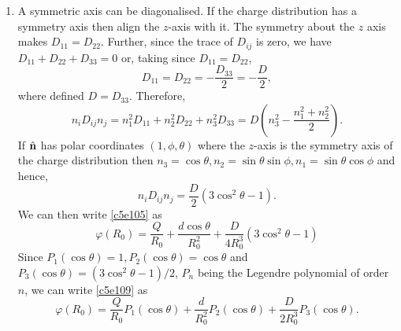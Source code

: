 \begin{enumerate}
\item A symmetric axis can be diagonalised. If the charge distribution has a 
symmetry axis then align the $z$-axis with it. The symmetry about the $z$ axis
makes $D_{11} = D_{22}$. Further, since the trace of $D_{ij}$ is zero, we have 
$D_{11} + D_{22} + D_{33} = 0$ or, taking since $D_{11} = D_{22}$,
\begin{equation}\label{c5e106}
D_{11} = D_{22} = -\frac{D_{33}}{2} = -\frac{D}{2},
\end{equation}
where defined $D = D_{33}$. Therefore,
\[
n_i D_{ij} n_j = n_1^2D_{11} + n_2^2D_{22} + n_3^2D_{33} = 
D\left(n_3^2 - \frac{n_1^2 + n_2^2}{2}\right).
\]
If $\hat{\mathbf{n}}$ has polar coordinates $(1, \phi, \theta)$ where the $z$-axis is the 
symmetry axis of the charge distribution then $n_3 = \cos\theta, n_2 = \sin\theta
\sin\phi, n_1 = \sin\theta\cos\phi$ and hence,
\begin{equation}\label{c5e107}
n_iD_{ij}n_j = \frac{D}{2}(3\cos^2\theta - 1).
\end{equation}
We can then write \eqref{c5e105} as
\begin{equation}\label{c5e108}
\varphi(R_0) = \frac{Q}{R_0} + \frac{d\cos\theta}{R_0^2} + 
\frac{D}{4R_0^3}(3\cos^2\theta - 1)
\end{equation}
Since $P_1(\cos\theta) = 1, P_2(\cos\theta) = \cos\theta$ and $P_3(\cos\theta)
= (3\cos^2\theta - 1)/2$, $P_n$ being the Legendre polynomial of order $n$, we 
can write \eqref{c5e109} as
\begin{equation}\label{c5e109}
\varphi(R_0) = \frac{Q}{R_0}P_1(\cos\theta) + \frac{d}{R_0^2}P_2(\cos\theta)
+ \frac{D}{2R_0^3}P_3(\cos\theta).
\end{equation}


\end{enumerate}
